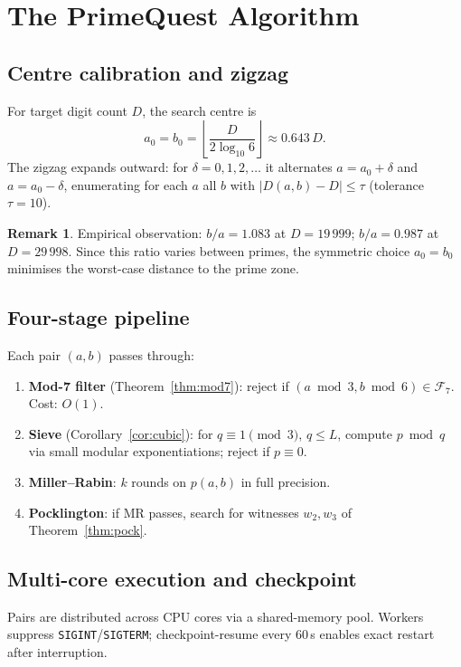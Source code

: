 \documentclass[11pt,a4paper]{article}
\theoremstyle{plain}
\theoremstyle{definition}
\newtheorem{remark}[theorem]{Remark}
\begin{document}
\section{The PrimeQuest Algorithm}
\label{sec:algorithm}

\subsection{Centre calibration and zigzag}

For target digit count $D$, the search centre is
\[
a_0 = b_0 = \left\lfloor \frac{D}{2 \log_{10} 6} \right\rfloor \approx 0.643 \, D.
\]
The zigzag expands outward: for $\delta = 0, 1, 2, \ldots$ it alternates
$a = a_0 + \delta$ and $a = a_0 - \delta$, enumerating for each $a$ all $b$
with $|D(a, b) - D| \le \tau$ (tolerance $\tau = 10$).

\begin{remark}\label{rem:ratio}
Empirical observation: $b/a = 1.083$ at $D = 19\,999$; $b/a = 0.987$ at
$D = 29\,998$. Since this ratio varies between primes, the symmetric choice
$a_0 = b_0$ minimises the worst-case distance to the prime zone.
\end{remark}

\subsection{Four-stage pipeline}

Each pair $(a, b)$ passes through:
\begin{enumerate}[leftmargin=*]
\item \textbf{Mod-7 filter} (Theorem~\ref{thm:mod7}): reject if
$(a \bmod 3, b \bmod 6) \in \mathcal{F}_7$. Cost: $O(1)$.
\item \textbf{Sieve} (Corollary~\ref{cor:cubic}): for $q \equiv 1 \pmod{3}$,
$q \le L$, compute $p \bmod q$ via small modular exponentiations; reject if
$p \equiv 0$.
\item \textbf{Miller--Rabin}: $k$ rounds on $p(a, b)$ in full precision.
\item \textbf{Pocklington}: if MR passes, search for witnesses $w_2, w_3$ of
Theorem~\ref{thm:pock}.
\end{enumerate}

\subsection{Multi-core execution and checkpoint}

Pairs are distributed across CPU cores via a shared-memory pool. Workers
suppress \texttt{SIGINT}/\texttt{SIGTERM}; checkpoint-resume every 60\,s
enables exact restart after interruption.
\end{document}
